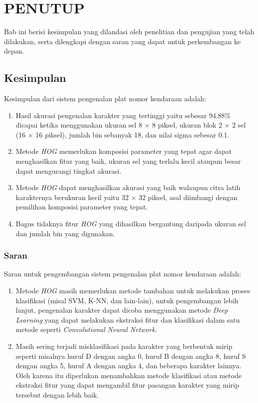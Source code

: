 \chapter{PENUTUP}

%
\vspace{4.5pt}
\noindent Bab ini berisi kesimpulan yang dilandasi oleh penelitian dan pengujian yang telah dilakukan, serta dilengkapi dengan saran yang dapat untuk perkembangan ke depan.\\

\section{Kesimpulan}
\noindent Kesimpulan dari sistem pengenalan plat nomor kendaraan adalah:
\begin{enumerate}
\item Hasil akurasi pengenalan karakter yang tertinggi yaitu sebesar 94.88\% dicapai ketika menggunakan ukuran sel 8 $\times$ 8 piksel, ukuran blok 2 $\times$ 2 sel (16 $\times$ 16 piksel), jumlah bin sebanyak 18, dan nilai sigma sebesar 0.1.
\item Metode \textit{HOG} memerlukan komposisi parameter yang tepat agar dapat menghasilkan fitur yang baik, ukuran sel yang terlalu kecil ataupun besar dapat mengurangi tingkat akurasi.
\item Metode \textit{HOG} dapat menghasilkan akurasi yang baik walaupun citra latih karakternya berukuran kecil yaitu 32 $\times$ 32 piksel, asal diimbangi dengan pemilihan komposisi parameter yang tepat.
\item Bagus tidaknya fitur \textit{HOG} yang dihasilkan bergantung daripada ukuran sel dan jumlah bin yang digunakan.\\
\end{enumerate}

\subsection{Saran}
\noindent Saran untuk pengembangan sistem pengenalan plat nomor kendaraan adalah:
\begin{enumerate}
\item Metode \textit{HOG} masih memerlukan metode tambahan untuk melakukan proses klasifikasi (misal SVM, K-NN, dan lain-lain), untuk pengembangan lebih lanjut, pengenalan karakter dapat dicoba menggunakan metode \textit{Deep Learning} yang dapat melakukan ekstraksi fitur dan klasifikasi dalam satu metode seperti \textit{Convolutional Neural Network}.
\item Masih sering terjadi misklasifikasi pada karakter yang berbentuk mirip seperti misalnya huruf D dengan angka 0, huruf B dengan angka 8, huruf S dengan angka 5, huruf A dengan angka 4, dan beberapa karakter lainnya. Oleh karena itu diperlukan menambahkan metode klasifikasi atau metode ekstraksi fitur yang dapat mengambil fitur pasangan karakter yang mirip tersebut dengan lebih baik.
\end{enumerate}

\newpage